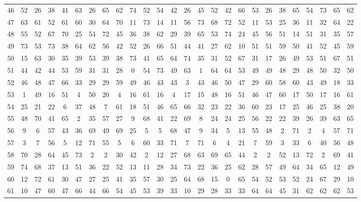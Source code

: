\begin{table}
\begin{tabular}{c c c c c c c c c c c c c c c c c c c c c c c c c c }
46 & 52 & 26 & 38 & 41 & 63 & 26 & 65 & 62 & 74 & 52 & 54 & 42 & 26 & 45 & 52 & 42 & 66 & 53 & 26 & 38 & 65 & 54 & 73 & 65 & 62 \\
47 & 63 & 61 & 52 & 61 & 60 & 30 & 64 & 70 & 11 & 73 & 14 & 11 & 56 & 73 & 68 & 72 & 52 & 11 & 53 & 25 & 36 & 11 & 32 & 64 & 22 \\
48 & 55 & 52 & 67 & 70 & 25 & 54 & 72 & 45 & 36 & 38 & 62 & 29 & 39 & 65 & 53 & 74 & 24 & 45 & 56 & 51 & 14 & 51 & 31 & 35 & 57 \\
49 & 73 & 53 & 73 & 38 & 64 & 62 & 56 & 42 & 52 & 26 & 66 & 51 & 44 & 41 & 27 & 62 & 10 & 51 & 51 & 59 & 50 & 41 & 52 & 45 & 59 \\
50 & 15 & 63 & 30 & 35 & 39 & 53 & 39 & 38 & 73 & 41 & 65 & 64 & 74 & 35 & 31 & 52 & 67 & 31 & 17 & 26 & 49 & 53 & 51 & 67 & 51 \\
51 & 44 & 42 & 44 & 53 & 59 & 31 & 31 & 28 & 0 & 54 & 73 & 49 & 63 & 1 & 64 & 64 & 53 & 49 & 49 & 48 & 29 & 48 & 50 & 32 & 50 \\
52 & 46 & 48 & 47 & 66 & 33 & 29 & 29 & 59 & 49 & 46 & 43 & 43 & 3 & 43 & 46 & 50 & 47 & 29 & 60 & 58 & 60 & 43 & 49 & 18 & 33 \\
53 & 1 & 49 & 16 & 51 & 4 & 50 & 20 & 4 & 16 & 61 & 16 & 4 & 17 & 15 & 48 & 16 & 51 & 46 & 47 & 60 & 17 & 50 & 17 & 16 & 61 \\
54 & 25 & 21 & 22 & 6 & 37 & 48 & 7 & 61 & 18 & 51 & 46 & 65 & 66 & 32 & 23 & 22 & 36 & 60 & 23 & 17 & 25 & 46 & 25 & 38 & 20 \\
55 & 48 & 70 & 41 & 65 & 2 & 35 & 57 & 27 & 9 & 68 & 41 & 22 & 69 & 8 & 24 & 24 & 25 & 56 & 22 & 22 & 39 & 26 & 39 & 63 & 65 \\
56 & 9 & 6 & 57 & 43 & 36 & 69 & 49 & 69 & 25 & 5 & 5 & 68 & 47 & 9 & 34 & 5 & 13 & 55 & 48 & 2 & 71 & 2 & 4 & 57 & 71 \\
57 & 3 & 7 & 56 & 5 & 12 & 71 & 55 & 5 & 6 & 60 & 33 & 71 & 7 & 71 & 6 & 4 & 21 & 7 & 59 & 3 & 33 & 6 & 40 & 56 & 48 \\
58 & 70 & 28 & 64 & 45 & 73 & 2 & 2 & 30 & 42 & 2 & 12 & 27 & 68 & 63 & 69 & 65 & 44 & 2 & 2 & 52 & 13 & 72 & 2 & 69 & 41 \\
59 & 74 & 68 & 37 & 13 & 51 & 36 & 22 & 52 & 13 & 11 & 28 & 34 & 73 & 22 & 36 & 25 & 62 & 28 & 57 & 49 & 64 & 34 & 65 & 12 & 49 \\
60 & 12 & 72 & 61 & 30 & 47 & 27 & 25 & 41 & 35 & 57 & 30 & 25 & 64 & 68 & 15 & 0 & 65 & 54 & 52 & 53 & 52 & 24 & 67 & 29 & 10 \\
61 & 10 & 47 & 60 & 47 & 66 & 44 & 66 & 54 & 45 & 53 & 39 & 33 & 10 & 29 & 28 & 33 & 33 & 64 & 64 & 45 & 31 & 62 & 62 & 62 & 53 \\

\end{tabular}
\end{table}
